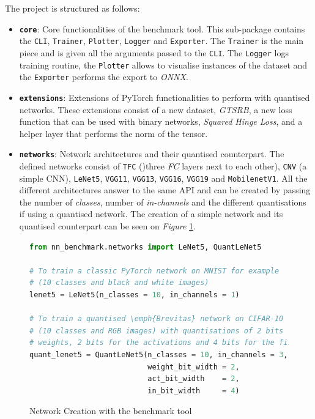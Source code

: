 The project is structured as follows:
\begin{itemize}
  \item \textbf{\texttt{core}}: Core functionalities of the benchmark tool. This sub-package contains the \texttt{CLI}, \texttt{Trainer}, \texttt{Plotter}, \texttt{Logger} and \texttt{Exporter}. The \texttt{Trainer} is the main piece and is given all the arguments passed to the \texttt{CLI}. The \texttt{Logger} logs training routine, the \texttt{Plotter} allows to visualise instances of the dataset and the \texttt{Exporter} performs the export to \emph{ONNX}.
  \item \textbf{\texttt{extensions}}: Extensions of PyTorch functionalities to perform with quantised networks. These extensions consist of a new dataset, \emph{GTSRB}, a new loss function that can be used with binary networks, \emph{Squared Hinge Loss}, and a helper layer that performs the norm of the tensor.
  \item \textbf{\texttt{networks}}: Network architectures and their quantised counterpart. The defined networks consist of \texttt{TFC} ()three \emph{FC} layers next to each other), \texttt{CNV} (a simple CNN), \texttt{LeNet5}, \texttt{VGG11}, \texttt{VGG13}, \texttt{VGG16}, \texttt{VGG19} and \texttt{MobilenetV1}. All the different architectures answer to the same API and can be created by passing the number of \emph{classes}, number of \emph{in-channels} and the different quantisations if using a quantised network. The creation of a simple network and its quantised counterpart can be seen on \emph{Figure} \ref{fig:NetworkCreation}.
\end{itemize}



\begin{figure}[htbp]
\centering
\begin{lstlisting}[language=Python]
from nn_benchmark.networks import LeNet5, QuantLeNet5

# To train a classic PyTorch network on MNIST for example
# (10 classes and black and white images)
lenet5 = LeNet5(n_classes = 10, in_channels = 1)

# To train a quantised \emph{Brevitas} network on CIFAR-10 for example
# (10 classes and RGB images) with quantisations of 2 bits for the
# weights, 2 bits for the activations and 4 bits for the first layer
quant_lenet5 = QuantLeNet5(n_classes = 10, in_channels = 3,
                           weight_bit_width = 2,
                           act_bit_width    = 2,
                           in_bit_width     = 4)
\end{lstlisting}
\caption[NetworkCreation]{Network Creation with the benchmark tool}
	\label{fig:NetworkCreation}
\end{figure}

